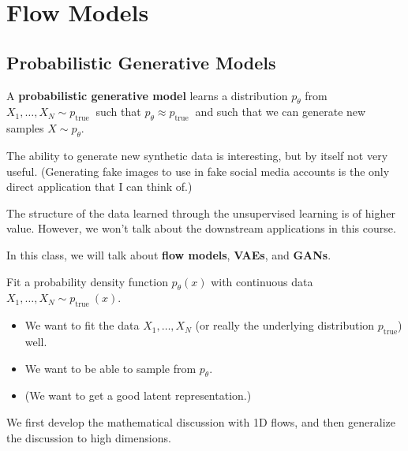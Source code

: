 \documentclass{report}
\begin{document}
\chapter{Flow Models}

\section{Probabilistic Generative Models}

\begin{definition}
    A \textbf{probabilistic generative model} learns a distribution $p_{\theta}$ from $X_{1}, \ldots, X_{N} \sim p_{\text {true }}$ such that $p_{\theta} \approx p_{\text {true }}$ and such that we can generate new samples $X \sim p_{\theta}$.

    The ability to generate new synthetic data is interesting, but by itself not very useful.
    (Generating fake images to use in fake social media accounts is the only direct application that I can think of.)

    The structure of the data learned through the unsupervised learning is of higher value. However, we won't talk about the downstream applications in this course.

    In this class, we will talk about \textbf{flow models}, \textbf{VAEs}, and \textbf{GANs}.
\end{definition}

\par\noindent\textcolor{gray}{\hdashrule{\textwidth}{0.4pt}{1pt 2pt}}

Fit a probability density function $p_{\theta}(x)$ with continuous data $X_{1}, \ldots, X_{N} \sim p_{\text {true }}(x)$.

\begin{itemize}
    \item We want to fit the data $X_{1}, \ldots, X_{N}$ (or really the underlying distribution $p_{\text {true}}$) well.
    \item We want to be able to sample from $p_{\theta}$.
    \item (We want to get a good latent representation.)
\end{itemize}

We first develop the mathematical discussion with 1D flows, and then generalize the discussion to high dimensions.
\end{document}
